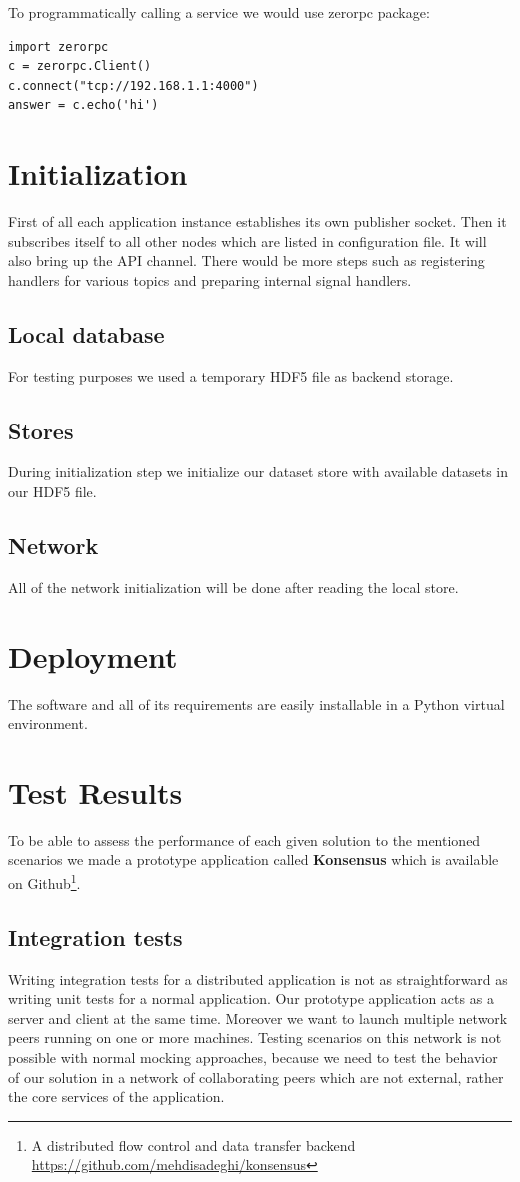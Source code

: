 To programmatically calling a service we would use zerorpc package:

\begin{lstlisting}[caption={Connecting to an API endpoint in ZeroRPC}]
import zerorpc
c = zerorpc.Client()
c.connect("tcp://192.168.1.1:4000")
answer = c.echo('hi')
\end{lstlisting}

\section{Initialization}
First of all each application instance establishes its own publisher socket. Then it subscribes
itself to all other nodes which are listed in configuration file. It will also bring up the API channel.
There would be more steps such as registering handlers for various topics and preparing internal
signal handlers.
\subsection{Local database}
For testing purposes we used a temporary HDF5 file as backend storage.
\subsection{Stores}
During initialization step we initialize our dataset store with available datasets in our HDF5 file.
\subsection{Network}
All of the network initialization will be done after reading the local store.

\section{Deployment}
The software and all of its requirements are easily installable in a Python virtual environment.

\section{Test Results}
To be able to assess the performance of each given solution to the mentioned scenarios we made a prototype application
called \textbf{Konsensus} which is available on Github\footnote{A distributed flow control and data 
transfer backend \url{https://github.com/mehdisadeghi/konsensus}}.

\subsection{Integration tests}
Writing integration tests for a distributed application is not as straightforward as writing unit tests for a normal application. 
Our prototype application acts as a server and client at the same time. Moreover we want to launch multiple 
network peers running on one or more machines. Testing scenarios on this network is not possible with
normal mocking approaches, because we need to test the behavior of our solution in a network of collaborating
peers which are not external, rather the core services of the application. 

